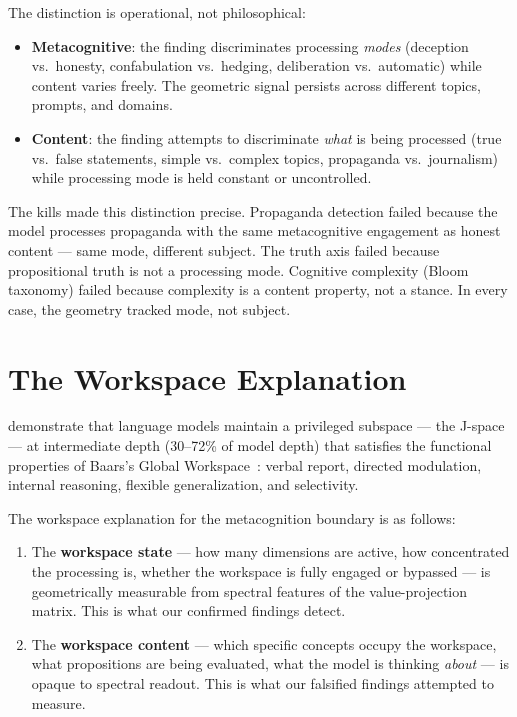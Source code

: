 \documentclass[11pt,a4paper]{article}
\begin{document}
The distinction is operational, not philosophical:

\begin{itemize}[nosep]
\item \textbf{Metacognitive}: the finding discriminates processing
  \emph{modes} (deception vs.\ honesty, confabulation vs.\ hedging,
  deliberation vs.\ automatic) while content varies freely. The
  geometric signal persists across different topics, prompts, and
  domains.
\item \textbf{Content}: the finding attempts to discriminate
  \emph{what} is being processed (true vs.\ false statements,
  simple vs.\ complex topics, propaganda vs.\ journalism) while
  processing mode is held constant or uncontrolled.
\end{itemize}

The kills made this distinction precise. Propaganda detection failed
because the model processes propaganda with the same metacognitive
engagement as honest content --- same mode, different subject. The
truth axis failed because propositional truth is not a processing
mode. Cognitive complexity (Bloom taxonomy) failed because complexity
is a content property, not a stance. In every case, the geometry
tracked mode, not subject.

\section{The Workspace Explanation}
\label{sec:workspace}

\citet{gurnee2026gwt} demonstrate that language models
maintain a privileged subspace --- the J-space --- at intermediate
depth (30--72\% of model depth) that satisfies the functional
properties of Baars's Global Workspace~\citep{baars1988cognitive}:
verbal report, directed modulation, internal reasoning, flexible
generalization, and selectivity.

The workspace explanation for the metacognition boundary is as
follows:

\begin{enumerate}[nosep]
\item The \textbf{workspace state} --- how many dimensions are active,
  how concentrated the processing is, whether the workspace is fully
  engaged or bypassed --- is geometrically measurable from spectral
  features of the value-projection matrix. This is what our confirmed
  findings detect.
\item The \textbf{workspace content} --- which specific concepts occupy
  the workspace, what propositions are being evaluated, what the model
  is thinking \emph{about} --- is opaque to spectral readout. This is
  what our falsified findings attempted to measure.
\end{enumerate}
\end{document}
